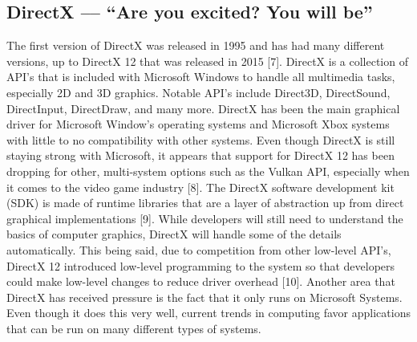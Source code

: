 \documentclass[onecolumn, draftclsnofoot,10pt, compsoc]{IEEEtran}
\begin{document}
\subsection{DirectX –-- ``Are you excited? You will be''}
The first version of DirectX was released in 1995 and has had many different versions, up to DirectX 12 that was released in 2015 [7]. DirectX is a collection of API's that is included with Microsoft Windows to handle all multimedia tasks, especially 2D and 3D graphics. Notable API's include Direct3D, DirectSound, DirectInput, DirectDraw, and many more. DirectX has been the main graphical driver for Microsoft Window's operating systems and Microsoft Xbox systems with little to no compatibility with other systems. Even though DirectX is still staying strong with Microsoft, it appears that support for DirectX 12 has been dropping for other, multi-system options such as the Vulkan API, especially when it comes to the video game industry [8].
\newline
\newline
The DirectX software development kit (SDK) is made of runtime libraries that are a layer of abstraction up from direct graphical implementations [9]. While developers will still need to understand the basics of computer graphics, DirectX will handle some of the details automatically. This being said, due to competition from other low-level API's, DirectX 12 introduced low-level programming to the system so that developers could make low-level changes to reduce driver overhead [10]. Another area that DirectX has received pressure is the fact that it only runs on Microsoft Systems. Even though it does this very well, current trends in computing favor applications that can be run on many different types of systems. 
\end{document}
